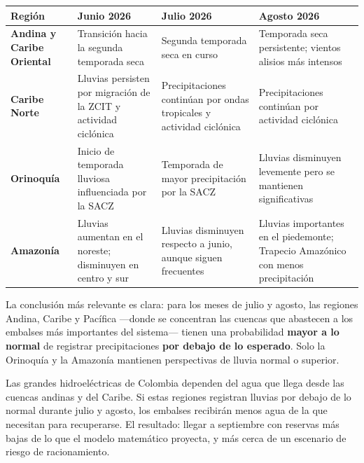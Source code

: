 \documentclass[11pt,a4paper]{article}
\begin{document}
\begin{center}
\small
{\linespread{1.1}\selectfont
\begin{tabular}{@{}p{3.2cm}p{3.7cm}p{3.7cm}p{3.7cm}@{}}
\toprule
\textbf{Región} & \textbf{Junio 2026} & \textbf{Julio 2026} & \textbf{Agosto 2026} \\
\midrule
\textbf{Andina y Caribe Oriental} &
Transición hacia la segunda temporada seca &
Segunda temporada seca en curso &
Temporada seca persistente; vientos alisios más intensos \\
\addlinespace
\textbf{Caribe Norte} &
Lluvias persisten por migración de la ZCIT y actividad ciclónica &
Precipitaciones continúan por ondas tropicales y actividad ciclónica &
Precipitaciones continúan por actividad ciclónica \\
\addlinespace
\textbf{Orinoquía} &
Inicio de temporada lluviosa influenciada por la SACZ &
Temporada de mayor precipitación por la SACZ &
Lluvias disminuyen levemente pero se mantienen significativas \\
\addlinespace
\textbf{Amazonía} &
Lluvias aumentan en el noreste; disminuyen en centro y sur &
Lluvias disminuyen respecto a junio, aunque siguen frecuentes &
Lluvias importantes en el piedemonte; Trapecio Amazónico con menos precipitación \\
\bottomrule
\end{tabular}}
\end{center}

\vspace{2mm}

La conclusión más relevante es clara: para los meses de julio y agosto, las regiones Andina, Caribe y Pacífica —donde se concentran las cuencas que abastecen a los embalses más importantes del sistema— tienen una probabilidad \textbf{mayor a lo normal} de registrar precipitaciones \textbf{por debajo de lo esperado}. Solo la Orinoquía y la Amazonía mantienen perspectivas de lluvia normal o superior.

\begin{alertbox}
Las grandes hidroeléctricas de Colombia dependen del agua que llega desde las cuencas andinas y del Caribe. Si estas regiones registran lluvias por debajo de lo normal durante julio y agosto, los embalses recibirán menos agua de la que necesitan para recuperarse. El resultado: llegar a septiembre con reservas más bajas de lo que el modelo matemático proyecta, y más cerca de un escenario de riesgo de racionamiento.
\end{alertbox}
\end{document}
